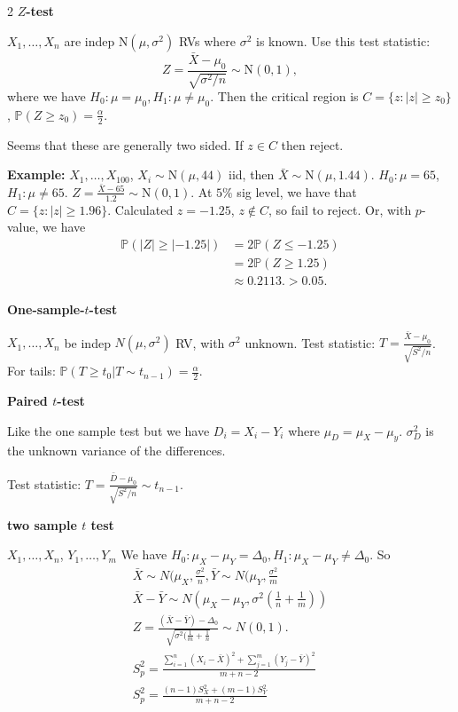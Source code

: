 \documentclass[10pt]{extarticle}
\theoremstyle{definition}
\theoremstyle{remark}
\newcommand{\pf}{\mathbb{P}}
\begin{document}
\begin{multicols}{2}
    \noindent 
    \textbf{$Z$-test}

    $X_1, \ldots, X_n$  are indep $\text{N}(\mu, \sigma^2)$ RVs where $\sigma^2$ is known. Use this test statistic: 
    \[
        Z = \frac{\bar{X} - \mu_0}{\sqrt{\sigma^2/n}} \sim \text{N}(0, 1),
    \] where we have $H_0: \mu = \mu_0, H_1: \mu \neq \mu_0.$
    Then the critical region is $C = \{ z : |z| \geq z_0\}$, $\pf(Z \geq z_0) = \frac{\alpha}{2}$.

    Seems that these are generally two sided. If $z \in C$ then reject. 

    \textbf{Example:} $X_1, \ldots, X_100$, $X_i \sim \text{N}(\mu, 44)$ iid, 
    then $\bar{X} \sim \text{N}(\mu, 1.44).$ $H_0: \mu = 65$, $H_1: \mu \neq 65.$
    $Z = \frac{\bar{X} - 65}{1.2} \sim \text{N}(0,1).$ At $5\%$ sig level, we 
    have that $C = \{z : |z| \geq 1.96\}$. Calculated $z = -1.25$, $z \notin C$, so 
    fail to reject. Or, with $p$-value, we have 
    \begin{align*}
        \pf(|Z| \geq |-1.25|) &= 2\pf(Z \leq -1.25) \\
                              &= 2\pf(Z \geq 1.25) \\
                              &\approx 0.2113. > 0.05.
    \end{align*}

    \noindent
    \textbf{One-sample-$t$-test}

    $X_1, \ldots, X_n$ be indep $N(\mu, \sigma^2)$ RV, with $\sigma^2$ unknown. 
    Test statistic: $T = \frac{\bar{X} - \mu_0}{\sqrt{S^2 / n}}$.
    For tails: $\pf( T \geq t_0 | T \sim t_{n-1}) = \frac{\alpha}{2}.$

    \noindent
    \textbf{Paired $t$-test}

    Like the one sample test but we have $D_i = X_i - Y_i$ where $\mu_D = \mu_X - \mu_y$. 
    $\sigma^2_D$ is the unknown variance of the differences. 
    
    Test statistic: $T = \frac{\bar{D} - \mu_0}{\sqrt{S^2 / n}} \sim t_{n-1}$.

    \noindent
    \textbf{two sample $t$ test} 

    $X_1, \ldots, X_n$, $Y_1, \ldots, Y_m$  
    We have $H_0: \mu_X - \mu_Y = \Delta_0, H_1: \mu_X - \mu_Y \neq \Delta_0$.
    So 
    \begin{gather*} 
        \bar{X} \sim N(\mu_X, \frac{\sigma^2}{n}, \bar{Y} \sim N(\mu_Y, \frac{\sigma^2}{m} \\
        \bar{X} - \bar{Y} \sim N(\mu_X - \mu_Y, \sigma^2(\frac{1}{n} + \frac{1}{m})) \\
        Z = \frac{(\bar{X} - \bar{Y}) - \Delta_0}{\sqrt{\sigma^2 (\frac{1}{m} + \frac{1}{n}}} \sim N(0, 1). \\
        S^2_p = \frac{\sum_{i=1}^{n}(X_i - \bar{X})^2 + \sum_{j=1}^m(Y_j - \bar{Y})^2}{m+n-2} \\
        S^2_p = \frac{(n-1)S^2_X + (m-1)S^2_Y}{m + n - 2}
    \end{gather*}


\end{multicols}
\end{document}
